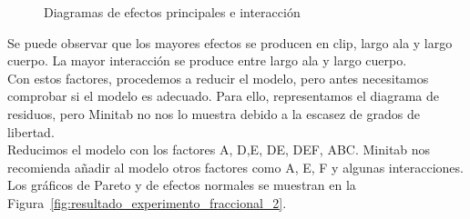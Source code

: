 \documentclass[12pt,a4paper,twoside,openright,titlepage,final]{article}
\begin{document}
\begin{figure}[htbp!]
	\centering
	\caption{Diagramas de efectos principales e interacción}
	\label{fig:efectos_principales_todos_los_factores}
\end{figure}

Se puede observar que los mayores efectos se producen en clip, largo ala y largo cuerpo. La mayor interacción se produce entre largo ala y largo cuerpo.\\

Con estos factores, procedemos a reducir el modelo, pero antes necesitamos comprobar si el modelo es adecuado. Para ello, representamos el diagrama de residuos, pero Minitab no nos lo muestra debido a la escasez de grados de libertad.\\

Reducimos el modelo con los factores A, D,E, DE, DEF, ABC. Minitab nos recomienda añadir al modelo otros factores como A, E, F y algunas interacciones. Los gráficos de Pareto y de efectos normales se muestran en la Figura~\ref{fig:resultado_experimento_fraccional_2}.\\
\end{document}
